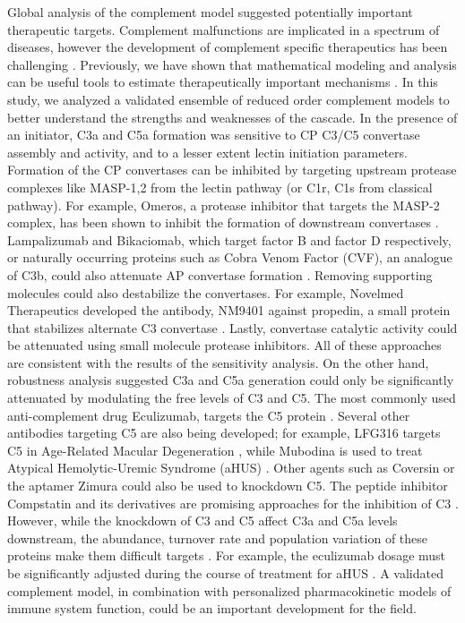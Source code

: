 \documentclass[12pt]{article}
\begin{document}
Global analysis of the complement model suggested potentially important therapeutic targets.
Complement malfunctions are implicated in a spectrum of diseases, however the
development of complement specific therapeutics has been challenging \cite{ricklin2007complement,morgan2015complement}.
Previously, we have shown that mathematical modeling and analysis can be useful tools to estimate therapeutically important mechanisms \cite{Luan:2007aa,Nayak:2008aa,Tasseff:2010aa,Rice:2016aa}.
In this study, we analyzed a validated ensemble of reduced order complement models to better understand the strengths and weaknesses of the cascade.
In the presence of an initiator, C3a and C5a formation was sensitive to CP C3/C5 convertase assembly and activity, and to a lesser extent lectin initiation parameters.
Formation of the CP convertases can be inhibited by targeting upstream protease complexes like MASP-1,2 from the lectin pathway (or C1r, C1s from classical pathway).
For example, Omeros, a protease inhibitor that targets the MASP-2 complex, has been shown to inhibit the formation of downstream convertases \cite{schwaeble2011methods}.
Lampalizumab and Bikaciomab, which target factor B and factor D respectively, or naturally occurring proteins such as Cobra Venom Factor (CVF), an analogue of C3b, could also attenuate AP convertase formation \cite{vogel2004recombinant,katschke2012inhibiting, hu2013therapeutic}.
Removing supporting molecules could also destabilize the convertases.
For example, Novelmed Therapeutics developed the antibody, NM9401 against propedin, a small protein that stabilizes alternate C3 convertase \cite{bansal2014humanized}.
Lastly, convertase catalytic activity could be attenuated using small molecule protease inhibitors. All of these approaches are consistent with the results of the sensitivity analysis.
On the other hand, robustness analysis suggested C3a and C5a generation could only be significantly attenuated by modulating the free levels of C3 and C5.
The most commonly used anti-complement drug Eculizumab, targets the C5 protein \cite{morgan2015complement}.
Several other antibodies targeting C5 are also being developed; for example, LFG316 targets C5 in Age-Related Macular Degeneration \cite{roguska2014generation},
while Mubodina is used to treat Atypical Hemolytic-Uremic Syndrome (aHUS) \cite{melis2015complement}.
Other agents such as Coversin \cite{weston2014clinical} or the aptamer Zimura \cite{epstein2007complement} could also be used to knockdown C5.
The peptide inhibitor Compstatin and its derivatives are promising approaches for the inhibition of C3 \cite{Mastellos:2015aa}.
However, while the knockdown of C3 and C5 affect C3a and C5a levels downstream, the abundance, turnover rate and population variation of these proteins make them difficult targets \cite{sissons1977metabolism, swaak1982determination}.
For example, the eculizumab dosage must be significantly adjusted during the course of treatment for aHUS \cite{noris2014dynamics}.
A validated complement model, in combination with personalized pharmacokinetic models of immune system function, could be an important development for the field.
\end{document}
